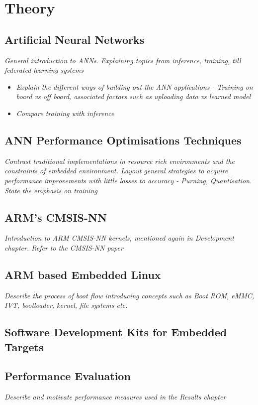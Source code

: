 \chapter{Theory}

\section[Artificial Neural Network (ANN)]{Artificial Neural Networks}
\textit{General introduction to ANNs. Explaining topics from inference, training, till federated learning systems}

\begin{itemize}
	\item \textit{Explain the different ways of building out the ANN applications - Training on board vs off board, associated factors such as uploading data vs learned model}
	\item \textit{Compare training with inference}
\end{itemize}

\section{ANN Performance Optimisations Techniques}
\textit{Contrast traditional implementations in resource rich environments and the constraints of embedded environment. Layout general strategies to acquire performance improvements with little losses to accuracy - Purning, Quantisation. State the emphasis on training}

\section{ARM's CMSIS-NN}
\textit{Introduction to ARM CMSIS-NN kernels, mentioned again in Development chapter. Refer to the CMSIS-NN paper}

\section{ARM based Embedded Linux}
\textit{Describe the process of boot flow introducing concepts such as Boot ROM, eMMC, IVT, bootloader, kernel, file systems etc.}

\section{Software Development Kits for Embedded Targets}

\section{Performance Evaluation}
\textit{Describe and motivate performance measures used in the Results chapter}
